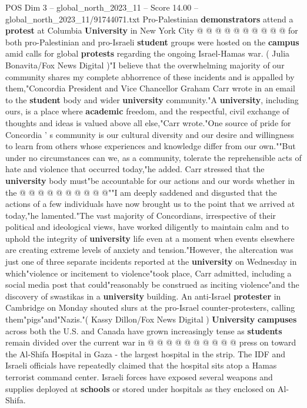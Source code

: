 \begin{textsample}{POS Dim 3 – global\_north\_2023\_11 – Score 14.00 – global\_north\_2023\_11/91744071.txt}
Pro-Palestinian \textbf{demonstrators} attend a \textbf{protest} at Columbia \textbf{University} in New York City @ @ @ @ @ @ @ @ @ @ for both pro-Palestinian and pro-Israeli \textbf{student} groups were hosted on the \textbf{campus} amid calls for global \textbf{protests} regarding the ongoing Israel-Hamas war. ( Julia Bonavita/Fox News Digital )"I believe that the overwhelming majority of our community shares my complete abhorrence of these incidents and is appalled by them,"Concordia President and Vice Chancellor Graham Carr wrote in an email to the \textbf{student} body and wider \textbf{university} community."A \textbf{university}, including ours, is a place where \textbf{academic} freedom, and the respectful, civil exchange of thoughts and ideas is valued above all else,"Carr wrote."One source of pride for Concordia ' s community is our cultural diversity and our desire and willingness to learn from others whose experiences and knowledge differ from our own.""But under no circumstances can we, as a community, tolerate the reprehensible acts of hate and violence that occurred today,"he added.
Carr stressed that the \textbf{university} body must"be accountable for our actions and our words whether in the @ @ @ @ @ @ @ @ @ @""I am deeply saddened and disgusted that the actions of a few individuals have now brought us to the point that we arrived at today,"he lamented."The vast majority of Concordians, irrespective of their political and ideological views, have worked diligently to maintain calm and to uphold the integrity of \textbf{university} life even at a moment when events elsewhere are creating extreme levels of anxiety and tension."However, the altercation was just one of three separate incidents reported at the \textbf{university} on Wednesday in which"violence or incitement to violence"took place, Carr admitted, including a social media post that could"reasonably be construed as inciting violence"and the discovery of swastikas in a \textbf{university} building.
An anti-Israel \textbf{protester} in Cambridge on Monday shouted slurs at the pro-Israel counter-protesters, calling them"pigs"and"Nazis."( Kassy Dillon/Fox News Digital ) \textbf{University} \textbf{campuses} across both the U.S. and Canada have grown increasingly tense as \textbf{students} remain divided over the current war in @ @ @ @ @ @ @ @ @ @ press on toward the Al-Shifa Hospital in Gaza - the largest hospital in the strip.
The IDF and Israeli officials have repeatedly claimed that the hospital sits atop a Hamas terrorist command center.
Israeli forces have exposed several weapons and supplies deployed at \textbf{schools} or stored under hospitals as they enclosed on Al-Shifa.

\end{textsample}
